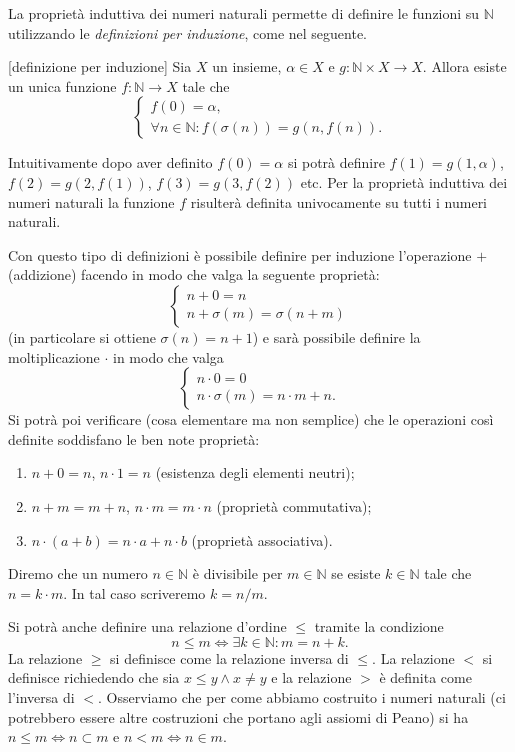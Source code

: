 \documentclass[italian,a4paper,hidelinks,headinclude]{scrartcl}
\newcommand{\NN}{{\mathbb N}}
\begin{document}
La proprietà induttiva dei numeri naturali permette di definire le funzioni su
$\NN$ utilizzando le \emph{definizioni per induzione}, come nel seguente.
\begin{theorem}\label{th:def_induction}[definizione per induzione]
Sia $X$ un insieme, $\alpha \in X$ e $g\colon \NN\times X \to X$.
Allora esiste un unica funzione $f\colon \NN \to X$ tale che
\[
\begin{cases}
  f(0) = \alpha,\\
  \forall n\in \NN\colon f(\sigma(n)) = g(n, f(n)).
\end{cases}
\]
\end{theorem}

Intuitivamente dopo aver definito $f(0) = \alpha$ si potrà definire
$f(1) = g(1, \alpha)$, $f(2) = g(2, f(1))$, $f(3) = g(3, f(2))$ etc.
Per la proprietà induttiva dei numeri naturali la funzione $f$ risulterà
definita univocamente su tutti i numeri naturali.

Con questo tipo di definizioni è possibile definire per induzione
l'operazione $+$ (addizione)
facendo in modo che valga la seguente proprietà:
\[
\begin{cases}
  n + 0 = n\\
  n + \sigma(m) = \sigma(n+m)
\end{cases}
\]
(in particolare si ottiene $\sigma(n)=n+1$)
e sarà possibile definire la moltiplicazione $\cdot$ in modo che
valga
\[
\begin{cases}
  n\cdot 0 = 0 \\
  n \cdot \sigma(m) = n\cdot m + n.
\end{cases}
\]
Si potrà poi verificare (cosa elementare ma non semplice)
che le operazioni così definite soddisfano le ben
note proprietà:
\begin{enumerate}
\item $n+0=n$, $n\cdot 1 = n$ (esistenza degli elementi neutri);
\item $n+m = m+n$, $n\cdot m = m\cdot n$ (proprietà commutativa);
\item $n\cdot (a+b) = n\cdot a + n\cdot b$ (proprietà associativa).
\end{enumerate}

Diremo che un numero $n\in \NN$ è divisibile per $m\in \NN$ se esiste $k\in \NN$
tale che $n = k \cdot m$. In tal caso scriveremo $k = n/m$.

Si potrà anche definire una relazione d'ordine $\le$ tramite la condizione
\[
  n \le m \iff \exists k \in \NN \colon m = n+k.
\]
La relazione $\ge$ si definisce come la relazione inversa di $\le$.
La relazione $<$ si
definisce richiedendo che sia $x\le y \land x\neq y$ e la relazione $>$
è definita come l'inversa di $<$.
Osserviamo che per come abbiamo costruito i numeri naturali (ci potrebbero essere
altre costruzioni che portano agli assiomi di Peano) si ha $n\le m \iff n \subset m$
e $n < m \iff n\in m$.
\end{document}

